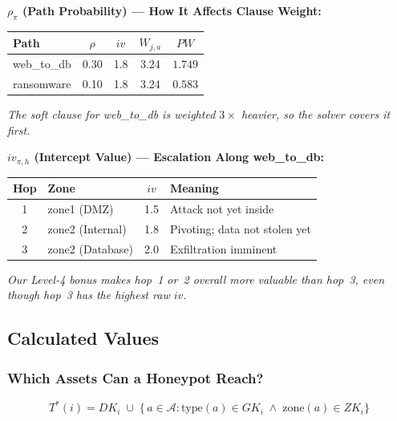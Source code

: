 \documentclass[journal]{IEEEtran}
\newcommand{\calA}{\mathcal{A}}
\begin{document}
\begin{examplebox}
\textbf{$\rho_\pi$ (Path Probability) ---
How It Affects Clause Weight:}
\begin{center}
\small
\renewcommand{\arraystretch}{1.1}
\begin{tabular}{@{}lcccc@{}}
\toprule
\textbf{Path} & $\rho$ & $iv$ & $W_{j,a}$ & $PW$ \\
\midrule
web\_to\_db & 0.30 & 1.8 & 3.24 & $\mathbf{1.749}$ \\
ransomware  & 0.10 & 1.8 & 3.24 & $\mathbf{0.583}$ \\
\bottomrule
\end{tabular}
\end{center}
\textit{The soft clause for web\_to\_db is weighted
$3\times$ heavier, so the solver covers it first.}
\end{examplebox}

\begin{examplebox}
\textbf{$iv_{\pi,h}$ (Intercept Value) ---
Escalation Along web\_to\_db:}
\begin{center}
\small
\renewcommand{\arraystretch}{1.1}
\begin{tabular}{@{}clcl@{}}
\toprule
\textbf{Hop} & \textbf{Zone} & $iv$ & \textbf{Meaning} \\
\midrule
1 & zone1 (DMZ)      & 1.5 & Attack not yet inside \\
2 & zone2 (Internal) & 1.8 & Pivoting; data not stolen yet \\
3 & zone2 (Database) & 2.0 & Exfiltration imminent \\
\bottomrule
\end{tabular}
\end{center}
\textit{Our Level-4 bonus makes hop~1 or~2 overall more
valuable than hop~3, even though hop~3 has the highest
raw $iv$.}
\end{examplebox}

\subsection{Calculated Values}

\subsubsection{Which Assets Can a Honeypot Reach?}
\begin{equation}
  T^*(i) = DK_i \;\cup\;
  \bigl\{\,a \in \calA :
    \mathrm{type}(a) \in GK_i \;\wedge\;
    \mathrm{zone}(a) \in ZK_i \bigr\}
\end{equation}
\end{document}
